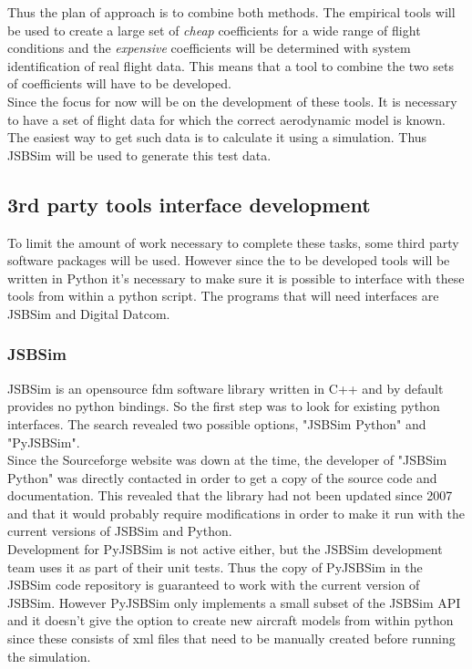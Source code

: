 Thus the plan of approach is to combine both methods. The empirical tools will be used to create a large set of \textit{cheap} coefficients for a wide range of flight conditions and the \textit{expensive} coefficients will be determined with system identification of real flight data. This means that a tool to combine the two sets of coefficients will have to be developed.\\

Since the focus for now will be on the development of these tools. It is necessary to have a set of flight data for which the correct aerodynamic model is known. The easiest way to get such data is to calculate it using a simulation. Thus JSBSim will be used to generate this test data.

\subsection{3rd party tools interface development}
To limit the amount of work necessary to complete these tasks, some third party software packages will be used. However since the to be developed tools will be written in Python it's necessary to make sure it is possible to interface with these tools from within a python script. The programs that will need interfaces are JSBSim and Digital Datcom.

\subsubsection{JSBSim}
JSBSim is an opensource \gls{fdm} software library written in C++ and by default provides no python bindings. So the first step was to look for existing python interfaces. The search revealed two possible options, "JSBSim Python" and "PyJSBSim". \\

Since the Sourceforge website was down at the time, the developer of "JSBSim Python" was directly contacted in order to get a copy of the source code and documentation. This revealed that the library had not been updated since 2007 and that it would probably require modifications in order to make it run with the current versions of JSBSim and Python. \\

Development for PyJSBSim is not active either, but the JSBSim development team uses it as part of their unit tests. Thus the copy of PyJSBSim in the JSBSim code repository is guaranteed to work with the current version of JSBSim. However PyJSBSim only implements a small subset of the JSBSim API and it doesn't give the option to create new aircraft models from within python since these consists of \gls{xml} files that need to be manually created before running the simulation. \\

